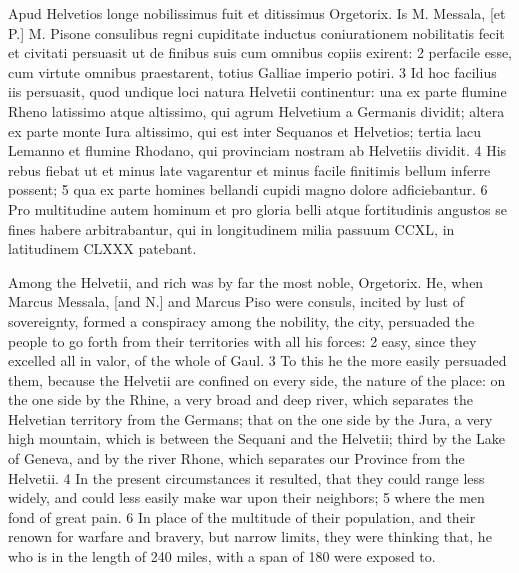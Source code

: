 \documentclass{article}
\begin{document}
\begin{multicols}{2}
Apud Helvetios longe nobilissimus fuit et ditissimus Orgetorix. Is M. Messala, [et P.] M. Pisone consulibus regni cupiditate inductus coniurationem nobilitatis fecit et civitati persuasit ut de finibus suis cum omnibus copiis exirent: 2 perfacile esse, cum virtute omnibus praestarent, totius Galliae imperio potiri. 3 Id hoc facilius iis persuasit, quod undique loci natura Helvetii continentur: una ex parte flumine Rheno latissimo atque altissimo, qui agrum Helvetium a Germanis dividit; altera ex parte monte Iura altissimo, qui est inter Sequanos et Helvetios; tertia lacu Lemanno et flumine Rhodano, qui provinciam nostram ab Helvetiis dividit. 4 His rebus fiebat ut et minus late vagarentur et minus facile finitimis bellum inferre possent; 5 qua ex parte homines bellandi cupidi magno dolore adficiebantur. 6 Pro multitudine autem hominum et pro gloria belli atque fortitudinis angustos se fines habere arbitrabantur, qui in longitudinem milia passuum CCXL, in latitudinem CLXXX patebant.

\vfill\null
\columnbreak
Among the Helvetii, and rich was by far the most noble, Orgetorix. He, when Marcus Messala, [and N.] and Marcus Piso were consuls, incited by lust of sovereignty, formed a conspiracy among the nobility, the city, persuaded the people to go forth from their territories with all his forces: 2 easy, since they excelled all in valor, of the whole of Gaul. 3 To this he the more easily persuaded them, because the Helvetii are confined on every side, the nature of the place: on the one side by the Rhine, a very broad and deep river, which separates the Helvetian territory from the Germans; that on the one side by the Jura, a very high mountain, which is between the Sequani and the Helvetii; third by the Lake of Geneva, and by the river Rhone, which separates our Province from the Helvetii. 4 In the present circumstances it resulted, that they could range less widely, and could less easily make war upon their neighbors; 5 where the men fond of great pain. 6 In place of the multitude of their population, and their renown for warfare and bravery, but narrow limits, they were thinking that, he who is in the length of 240 miles, with a span of 180 were exposed to.
\end{multicols}
\end{document}
